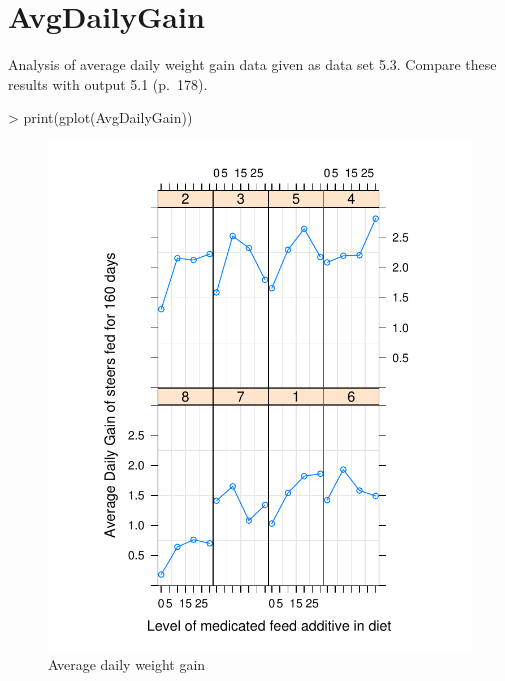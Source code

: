 \documentclass[12pt]{article}
\begin{document}

\appendix

\section{AvgDailyGain}
\label{sec:AvgDailyGain}

Analysis of average daily weight gain data given as data set 5.3.
Compare these results with output 5.1 (p.~178).

\begin{Schunk}
\begin{Sinput}
> print(gplot(AvgDailyGain))
\end{Sinput}
\end{Schunk}
\begin{figure}[tbp]
  \centering
  \includegraphics{figs/f-adg1}
  \caption{Average daily weight gain}
  \label{fig:adg1}
\end{figure}
\end{document}
